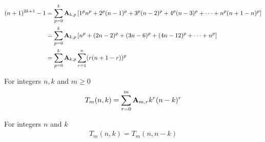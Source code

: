 \begin{proposition}
    \begin{align*}
    (n+1)
        ^{2k+1} - 1
        &= \sum_{p=0}^{k} {\mathbf{A}} \sb{k,p} \left[ 1^p n^p + 2^p (n-1)^p + 3^p (n-2)^p + 4^p (n-3)^p + \cdots +  n^p (n+1-n)^p  \right] \\
        &= \sum_{p=0}^{k} {\mathbf{A}} \sb{k,p} \left[ n^p + (2n-2)^p + (3n-6)^p + (4n-12)^p + \cdots +  n^p  \right] \\
        &= \sum_{p=0}^{k} {\mathbf{A}} \sb{k,p} \sum_{r=1}^{n} (r (n+1-r))^p
    \end{align*}
\end{proposition}
\begin{definition}
    For integers $n,k$ and $m \geq 0$
    \label{def:bivariate-sum-Tm}
    \begin{align*}
        T_{m}(n,k) = \sum_{r=0}^{m} {\mathbf{A}} \sb{m,r} k^r (n-k)^r
    \end{align*}
\end{definition}

\begin{proposition}[Symmetry of $T_m$]
    \label{prop:Tm-symmetry}
    For integers $n$ and $k$
    \begin{align*}
        T_{m} (n, k) = T_{m} (n, n-k)
    \end{align*}
\end{proposition}









